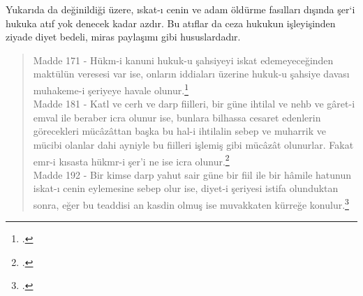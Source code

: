 Yukarıda da değinildiği üzere, ıskat-ı cenin ve adam öldürme fasılları dışında şer`i hukuka atıf yok denecek kadar azdır. Bu atıflar da ceza hukukun işleyişinden ziyade diyet bedeli, miras paylaşımı gibi hususlardadır.
\begin{quote}
    Madde 171 - Hükm-i kanuni hukuk-u şahsiyeyi iskat edemeyeceğinden maktülün veresesi var ise, onların iddiaları üzerine hukuk-u şahsiye davası muhakeme-i şeriyeye havale olunur.\footcite[861]{islam_osmanli_hukuku}\\
    Madde 181 - Katl ve cerh ve darp fiilleri, bir güne ihtilal ve nehb ve gâret-i emval ile beraber icra olunur ise, bunlara bilhassa cesaret edenlerin görecekleri mücâzâttan başka bu hal-i ihtilalin sebep ve muharrik ve mücibi olanlar dahi ayniyle bu fiilleri işlemiş gibi mücâzât olunurlar. Fakat emr-i kısasta hükmr-i şer'i ne ise icra olunur.\footcite[862]{islam_osmanli_hukuku}\\
    Madde 192 - Bir kimse darp yahut sair güne bir fiil ile bir hâmile hatunun iskat-ı cenin eylemesine sebep olur ise, diyet-i şeriyesi istifa olunduktan sonra, eğer bu teaddisi an kasdin olmuş ise muvakkaten kürreğe konulur.\footcite[864]{islam_osmanli_hukuku}
\end{quote}
